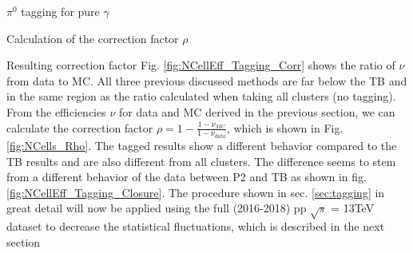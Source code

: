 \documentclass[ALICE]{ALICE_analysis_notes}
\newcommand{\PZ}{$\pi^0$\xspace}
\newcommand{\g}{$\gamma$\xspace}
\begin{document}
\begin{section}{\PZ tagging for pure \g}
\begin{section}{Calculation of the correction factor $\rho$}
\end{section}

\begin{subsection}{Resulting correction factor}
	Fig. \ref{fig:NCellEff_Tagging_Corr} shows the ratio of $\nu$ from data to MC. All three previous discussed methods are far below the TB and in the same region as the ratio calculated when taking all clusters (no tagging).\\
	From the efficiencies $\nu$ for data and MC derived in the previous section, we can calculate the correction factor $\rho = 1 - \frac{1- \nu_{MC}}{1- \nu_{data}}$, which is shown in Fig.\ref{fig:NCells_Rho}. The tagged results show a different behavior compared to the TB results and are also different from all clusters. The difference seems to stem from a different behavior of the data between P2 and TB as shown in fig. \ref{fig:NCellEff_Tagging_Closure}.
    The procedure shown in sec. \ref{sec:tagging} in great detail will now be applied using the full (2016-2018) pp $\sqrt{s}$ = 13TeV dataset to decrease the statistical fluctuations, which is described in the next section
	
\end{subsection}


\end{section}


\newpage
\end{document}
